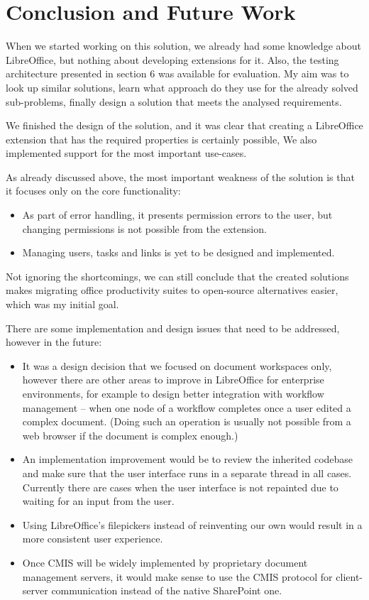 \section{Conclusion and Future Work}

When we started working on this solution, we already had some knowledge about
LibreOffice, but nothing about developing extensions for it. Also, the testing
architecture presented in section 6 was available for evaluation. My aim was to
look up similar solutions, learn what approach do they use for the already
solved sub-problems, finally design a solution that meets the analysed
requirements.

We finished the design of the solution, and it was clear that creating a
LibreOffice extension that has the required properties is certainly possible,
We also implemented support for the most important use-cases.

As already discussed above, the most important weakness of the solution is that
it focuses only on the core functionality:

\begin{itemize}
\item As part of error handling, it presents permission errors to the user, but
changing permissions is not possible from the extension.
\item Managing users, tasks and links is yet to be designed and implemented.
\end{itemize}

Not ignoring the shortcomings, we can still conclude that the created solutions
makes migrating office productivity suites to open-source alternatives easier,
which was my initial goal.

There are some implementation and design issues that need to be addressed,
however in the future:

\begin{itemize}
\item It was a design decision that we focused on document workspaces only,
however there are other areas to improve in LibreOffice for enterprise
environments, for example to design better integration with workflow management
-- when one node of a workflow completes once a user edited a complex document.
(Doing such an operation is usually not possible from a web browser if the
document is complex enough.)
\item An implementation improvement would be to review the inherited codebase
and make sure that the user interface runs in a separate thread in all cases.
Currently there are cases when the user interface is not repainted due to
waiting for an input from the user.
\item Using LibreOffice's filepickers instead of reinventing our own would
result in a more consistent user experience.
\item Once CMIS will be widely implemented by proprietary document management
servers, it would make sense to use the CMIS protocol for client-server
communication instead of the native SharePoint one.
\end{itemize}
